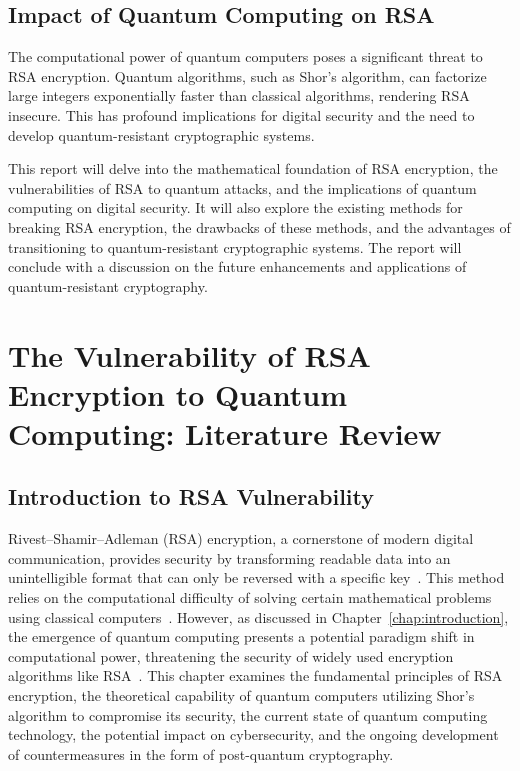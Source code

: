 \documentclass[12pt,a4paper]{report}
\begin{document}
\section{Impact of Quantum Computing on RSA}
The computational power of quantum computers poses a significant threat to RSA encryption. Quantum algorithms, such as Shor's algorithm, can factorize large integers exponentially faster than classical algorithms, rendering RSA insecure. This has profound implications for digital security and the need to develop quantum-resistant cryptographic systems.

This report will delve into the mathematical foundation of RSA encryption, the vulnerabilities of RSA to quantum attacks, and the implications of quantum computing on digital security. It will also explore the existing methods for breaking RSA encryption, the drawbacks of these methods, and the advantages of transitioning to quantum-resistant cryptographic systems. The report will conclude with a discussion on the future enhancements and applications of quantum-resistant cryptography.

\chapter{The Vulnerability of RSA Encryption to Quantum Computing: Literature Review}

\section{Introduction to RSA Vulnerability}
Rivest–Shamir–Adleman (RSA) encryption, a cornerstone of modern digital communication, provides security by transforming readable data into an unintelligible format that can only be reversed with a specific key~\cite{Okta}. This method relies on the computational difficulty of solving certain mathematical problems using classical computers~\cite{SecureW2}. However, as discussed in Chapter~\ref{chap:introduction}, the emergence of quantum computing presents a potential paradigm shift in computational power, threatening the security of widely used encryption algorithms like RSA~\cite{AuthoreaImplementation}. This chapter examines the fundamental principles of RSA encryption, the theoretical capability of quantum computers utilizing Shor's algorithm to compromise its security, the current state of quantum computing technology, the potential impact on cybersecurity, and the ongoing development of countermeasures in the form of post-quantum cryptography.
\end{document}
